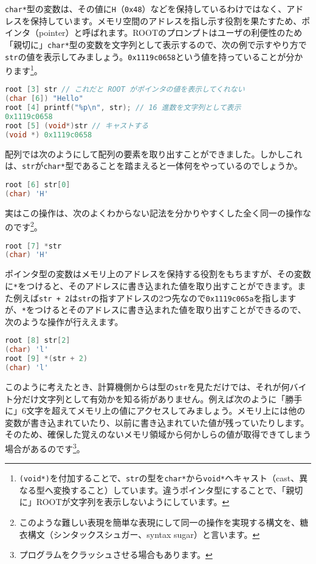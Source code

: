 \texttt{char*}型の変数は、その値に\texttt{H}（\texttt{0x48}）などを保持しているわけではなく、アドレスを保持しています。メモリ空間のアドレスを指し示す役割を果たすため、ポインタ（pointer）と呼ばれます。ROOTのプロンプトはユーザの利便性のため「親切に」\texttt{char*}型の変数を文字列として表示するので、次の例で示すやり方で\texttt{str}の値を表示してみましょう。\texttt{0x1119c0658}という値を持っていることが分かります\footnote{\texttt{(void*)}を付加することで、\texttt{str}の型を\texttt{char*}から\texttt{void*}へキャスト（cast、異なる型へ変換すること）しています。違うポインタ型にすることで、「親切に」ROOTが文字列を表示しないようにしています。}。

\begin{lstlisting}[language=c++]
root [3] str // これだと ROOT がポインタの値を表示してくれない
(char [6]) "Hello"
root [4] printf("%p\n", str); // 16 進数を文字列として表示
0x1119c0658
root [5] (void*)str // キャストする
(void *) 0x1119c0658
\end{lstlisting}

配列では次のようにして配列の要素を取り出すことができました。しかしこれは、\texttt{str}が\texttt{char*}型であることを踏まえると一体何をやっているのでしょうか。
\begin{lstlisting}[language=c++]
root [6] str[0]
(char) 'H'
\end{lstlisting}
実はこの操作は、次のよくわからない記法を分かりやすくした全く同一の操作なのです\footnote{このような難しい表現を簡単な表現にして同一の操作を実現する構文を、糖衣構文（シンタックスシュガー、syntax sugar）と言います。}。
\begin{lstlisting}[language=c++]
root [7] *str
(char) 'H'
\end{lstlisting}
ポインタ型の変数はメモリ上のアドレスを保持する役割をもちますが、その変数に\texttt{*}をつけると、そのアドレスに書き込まれた値を取り出すことができます。また例えば\texttt{str + 2}は\texttt{str}の指すアドレスの2つ先なので\texttt{0x1119c065a}を指しますが、\texttt{*}をつけるとそのアドレスに書き込まれた値を取り出すことができるので、次のような操作が行ええます。
\begin{lstlisting}[language=c++]
root [8] str[2]
(char) 'l'
root [9] *(str + 2)
(char) 'l'
\end{lstlisting}
このように考えたとき、計算機側からは型の\texttt{str}を見ただけでは、それが何バイト分だけ文字列として有効かを知る術がありません。例えば次のように「勝手に」6文字を超えてメモリ上の値にアクセスしてみましょう。メモリ上には他の変数が書き込まれていたり、以前に書き込まれていた値が残っていたりします。そのため、確保した覚えのないメモリ領域から何かしらの値が取得できてしまう場合があるのです\footnote{プログラムをクラッシュさせる場合もあります。}。

